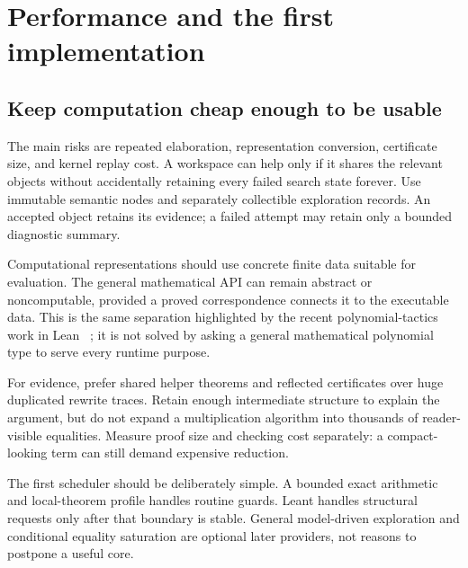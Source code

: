 \documentclass[11pt,letterpaper]{article}
\theoremstyle{definition}
\theoremstyle{remark}
\begin{document}
\section{Performance and the first implementation}
\label{sec:implementation}

\subsection{Keep computation cheap enough to be usable}
The main risks are repeated elaboration, representation conversion, certificate
size, and kernel replay cost. A workspace can help only if it shares the relevant
objects without accidentally retaining every failed search state forever.
Use immutable semantic nodes and separately collectible exploration records.
An accepted object retains its evidence; a failed attempt may retain only a
bounded diagnostic summary.

Computational representations should use concrete finite data suitable for
evaluation. The general mathematical API can remain abstract or noncomputable,
provided a proved correspondence connects it to the executable data. This is
the same separation highlighted by the recent polynomial-tactics work in Lean
~\cite{polynomial-lean}; it is not solved by asking a general mathematical
polynomial type to serve every runtime purpose.

For evidence, prefer shared helper theorems and reflected certificates over
huge duplicated rewrite traces. Retain enough intermediate structure to explain
the argument, but do not expand a multiplication algorithm into thousands of
reader-visible equalities. Measure proof size and checking cost separately:
a compact-looking term can still demand expensive reduction.

The first scheduler should be deliberately simple. A bounded exact arithmetic
and local-theorem profile handles routine guards. Leant handles structural
requests only after that boundary is stable. General model-driven exploration
and conditional equality saturation are optional later providers, not reasons
to postpone a useful core.
\end{document}

